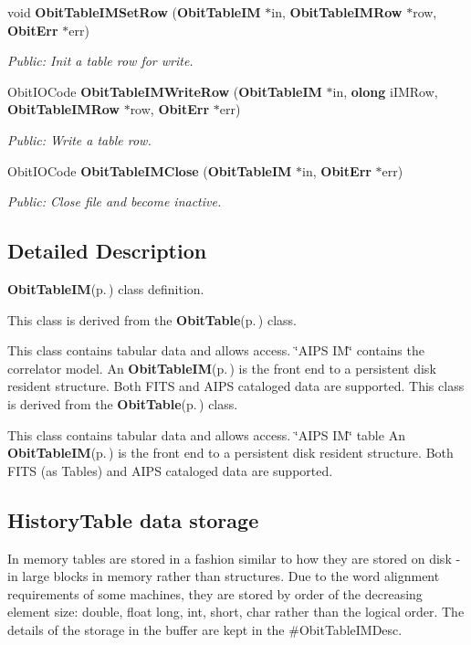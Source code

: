 \begin{CompactItemize}
void {\bf Obit\-Table\-IMSet\-Row} ({\bf Obit\-Table\-IM} $\ast$in, {\bf Obit\-Table\-IMRow} $\ast$row, {\bf Obit\-Err} $\ast$err)
\begin{CompactList}\small\item\em Public: Init a table row for write. \item\end{CompactList}\item 
Obit\-IOCode {\bf Obit\-Table\-IMWrite\-Row} ({\bf Obit\-Table\-IM} $\ast$in, {\bf olong} i\-IMRow, {\bf Obit\-Table\-IMRow} $\ast$row, {\bf Obit\-Err} $\ast$err)
\begin{CompactList}\small\item\em Public: Write a table row. \item\end{CompactList}\item 
Obit\-IOCode {\bf Obit\-Table\-IMClose} ({\bf Obit\-Table\-IM} $\ast$in, {\bf Obit\-Err} $\ast$err)
\begin{CompactList}\small\item\em Public: Close file and become inactive. \item\end{CompactList}\end{CompactItemize}


\subsection{Detailed Description}
{\bf Obit\-Table\-IM}{\rm (p.\,\pageref{structObitTableIM})} class definition. 

This class is derived from the {\bf Obit\-Table}{\rm (p.\,\pageref{structObitTable})} class.

This class contains tabular data and allows access. \char`\"{}AIPS IM\char`\"{} contains the correlator model. An {\bf Obit\-Table\-IM}{\rm (p.\,\pageref{structObitTableIM})} is the front end to a persistent disk resident structure. Both FITS and AIPS cataloged data are supported. This class is derived from the {\bf Obit\-Table}{\rm (p.\,\pageref{structObitTable})} class.

This class contains tabular data and allows access. \char`\"{}AIPS IM\char`\"{} table An {\bf Obit\-Table\-IM}{\rm (p.\,\pageref{structObitTableIM})} is the front end to a persistent disk resident structure. Both FITS (as Tables) and AIPS cataloged data are supported.\subsection{History\-Table data storage}\label{ObitTableWX_8h_TableDataStorage}
In memory tables are stored in a fashion similar to how they are stored on disk - in large blocks in memory rather than structures. Due to the word alignment requirements of some machines, they are stored by order of the decreasing element size: double, float long, int, short, char rather than the logical order. The details of the storage in the buffer are kept in the \#Obit\-Table\-IMDesc.

